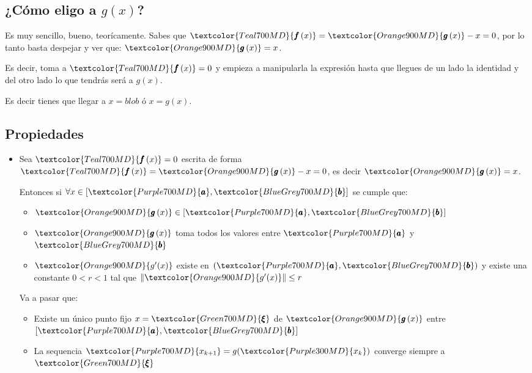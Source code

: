 \documentclass[12pt, fleqn]{report}                             %
\theoremstyle{break}                                            %
\newcommand{\Wrap}[1]           {\left( #1 \right)}             %
\newcommand{\Abs}[1]    {\left\lVert #1 \right\lVert}           %
\newcommand{\Color}[2]{\textcolor{#1}{#2}}                      %
\newcommand \ColorFun          {Teal700MD}                      %
\newcommand \ColorFunG         {Orange900MD}                    %
\newcommand \ColorRoot         {Green700MD}                     %
\newcommand \ColorVarA         {Purple700MD}                    %
\newcommand \ColorVarB         {BlueGrey700MD}                  %
\newcommand \ColorVarX         {Purple300MD}                    %
\newcommand \ColorVarXpu       {Purple700MD}                    %
\newcommand \Fun[1]      {\Color{\ColorFun}{\pmb{f}\Wrap{#1}}}          %
\newcommand \FunG[1]     {\Color{\ColorFunG}{\pmb{g}\Wrap{#1}}}         %
\newcommand \Root        {\Color{\ColorRoot}{\pmb{\xi} }}               %
\newcommand \VarA        {\Color{\ColorVarA}{\pmb{a} }}                 %
\newcommand \VarB        {\Color{\ColorVarB}{\pmb{b} }}                 %
\newcommand \VarX        {\Color{\ColorVarX}{x_k }}                     %
\newcommand \VarXpu      {\Color{\ColorVarXpu}{x_{k+1}  }}              %
\begin{document}
        \clearpage
        \subsection{¿Cómo eligo a $g(x)$?}

            Es muy sencillo, bueno, teorícamente. Sabes que $\Fun{x} = \FunG{x} - x = 0$,
            por lo tanto basta despejar y ver que: $\FunG{x} = x$.
            
            Es decir, toma a $\Fun{x} = 0$ y empieza a manipularla la expresión hasta
            que llegues de un lado la identidad y del otro lado lo que tendrás será a $g(x)$.

            Es decir tienes que llegar a $x = blob$ ó $x = g(x)$.

            

        \subsection{Propiedades}

            \begin{itemize}
                \item Sea $\Fun{x} = 0$ escrita de forma $\Fun{x} = \FunG{x} - x = 0$, es decir
                    $\FunG{x} = x$.

                    Entonces si $\forall x \in [\VarA, \VarB]$ se cumple que:
                    \begin{itemize}
                        \item $\FunG{x} \in [\VarA, \VarB]$
                        \item $\FunG{x}$ toma todos los valores entre $\VarA$ y $\VarB$
                        \item $\Color{\ColorFunG}{g'(x)}$ existe en $(\VarA, \VarB)$ y existe una constante $0 < r < 1$ tal que
                            $\Abs{\Color{\ColorFunG}{g'(x)}} \leq r$
                    \end{itemize}

                    Va a pasar que: 
                    \begin{itemize}
                        \item Existe un único punto fijo $x = \Root$ de $\FunG{x}$ entre $[\VarA, \VarB]$
                        \item La sequencia $\VarXpu = g(\VarX)$ converge siempre a $\Root$
                    \end{itemize}

            \end{itemize}
\end{document}
